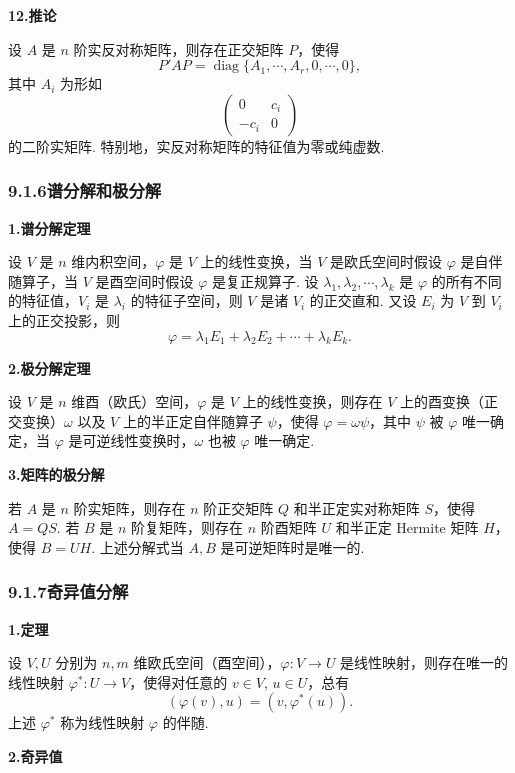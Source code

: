\documentclass[UTF8, 12pt, fontset=fandol, oneside]{ctexart}
\begin{document}
\noindent\textbf{12.\quad 推论}

设 $A$ 是 $n$ 阶实反对称矩阵，则存在正交矩阵 $P$，使得
\[
P'AP=\operatorname{diag}\{A_1,\cdots,A_r,0,\cdots,0\},
\]
其中 $A_i$ 为形如
\[
\begin{pmatrix}
0 & c_i\\
-c_i & 0
\end{pmatrix}
\]
的二阶实矩阵. 特别地，实反对称矩阵的特征值为零或纯虚数.

\subsubsection*{9.1.6\quad 谱分解和极分解}

\noindent\textbf{1.\quad 谱分解定理}

设 $V$ 是 $n$ 维内积空间，$\varphi$ 是 $V$ 上的线性变换，当 $V$ 是欧氏空间时假设 $\varphi$ 是自伴随算子，当 $V$ 是酉空间时假设 $\varphi$ 是复正规算子. 设 $\lambda_1,\lambda_2,\cdots,\lambda_k$ 是 $\varphi$ 的所有不同的特征值，$V_i$ 是 $\lambda_i$ 的特征子空间，则 $V$ 是诸 $V_i$ 的正交直和. 又设 $E_i$ 为 $V$ 到 $V_i$ 上的正交投影，则
\[
\varphi=\lambda_1E_1+\lambda_2E_2+\cdots+\lambda_kE_k.
\]

\noindent\textbf{2.\quad 极分解定理}

设 $V$ 是 $n$ 维酉（欧氏）空间，$\varphi$ 是 $V$ 上的线性变换，则存在 $V$ 上的酉变换（正交变换）$\omega$ 以及 $V$ 上的半正定自伴随算子 $\psi$，使得 $\varphi=\omega\psi$，其中 $\psi$ 被 $\varphi$ 唯一确定，当 $\varphi$ 是可逆线性变换时，$\omega$ 也被 $\varphi$ 唯一确定.

\noindent\textbf{3.\quad 矩阵的极分解}

若 $A$ 是 $n$ 阶实矩阵，则存在 $n$ 阶正交矩阵 $Q$ 和半正定实对称矩阵 $S$，使得 $A=QS$. 若 $B$ 是 $n$ 阶复矩阵，则存在 $n$ 阶酉矩阵 $U$ 和半正定 Hermite 矩阵 $H$，使得 $B=UH$. 上述分解式当 $A,B$ 是可逆矩阵时是唯一的.

\subsubsection*{9.1.7\quad 奇异值分解}

\noindent\textbf{1.\quad 定理}

设 $V,U$ 分别为 $n,m$ 维欧氏空间（酉空间），$\varphi:V\to U$ 是线性映射，则存在唯一的线性映射 $\varphi^*:U\to V$，使得对任意的 $v\in V$, $u\in U$，总有
\[
(\varphi(v),u)=(v,\varphi^*(u)).
\]
上述 $\varphi^*$ 称为线性映射 $\varphi$ 的伴随.

\noindent\textbf{2.\quad 奇异值}
\end{document}
